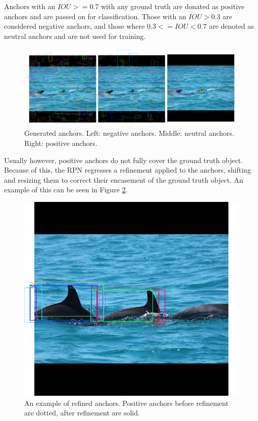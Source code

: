Anchors with an $IOU >= 0.7$ with any ground truth are donated as positive anchors and are passed on for classification. Those with an $IOU > 0.3$ are considered negative anchors, and those where $0.3 <= IOU < 0.7$ are denoted as neutral anchors and are not used for training. 

\begin{figure}
	\begin{center}
		\includegraphics[scale=0.25]{Chapter2/figs/anchor-types.png}
	\end{center}
	\caption{Generated anchors. Left: negative anchors. Middle: neutral anchors. Right: positive anchors.}
	\label{fig:anchor-types}
\end{figure}

Usually however, positive anchors do not fully cover the ground truth object. Because of this, the RPN regresses a refinement applied to the anchors, shifting and resizing them to correct their encasement of the ground truth object. An example of this can be seen in Figure \ref{fig:rpn-refined}.

\begin{figure}
	\begin{center}
		\includegraphics[scale=0.3]{Chapter2/figs/rpn-refined.png}
	\end{center}
	\caption{An example of refined anchors. Positive anchors before refinement are dotted, after refinement are solid.}
	\label{fig:rpn-refined}
\end{figure}

